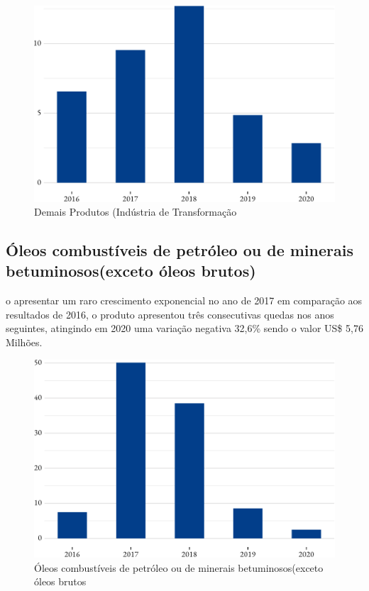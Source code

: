 \begin{figure}[h] 
	\caption{Demais Produtos (Indústria de Transformação}
	\includegraphics{fig/outros1-1.pdf}
\end{figure}

\subsection{Óleos combustíveis de petróleo ou de minerais betuminosos(exceto óleos brutos)}
\par o apresentar um raro crescimento exponencial no ano de 2017 em comparação aos resultados de 2016, o produto apresentou três consecutivas quedas nos anos seguintes, atingindo em 2020 uma variação negativa 32,6\% sendo o valor US\$ 5,76 Milhões.

\begin{figure}[h] 
	\caption{Óleos combustíveis de petróleo ou de minerais betuminosos(exceto óleos brutos}
	\includegraphics{fig/oleo-1.pdf}
\end{figure}


